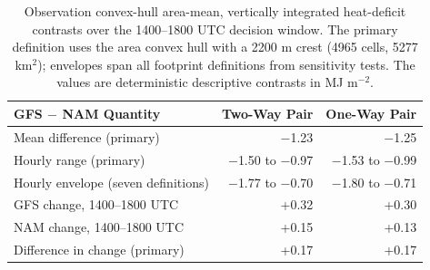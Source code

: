 \documentclass[air,article,accept,moreauthors]{Definitions/mdpi}
\begin{document}
\vspace{-9pt}
\begin{table}[H]
\caption{Observation convex-hull area-mean, vertically integrated heat-deficit contrasts over the 1400--1800 UTC decision window.
The primary definition uses the area convex hull with a 2200 m crest (4965 cells, 5277 km$^{2}$); envelopes span all footprint definitions from sensitivity tests.
The values are deterministic descriptive contrasts in MJ m$^{-2}$.}
\label{tab:v3-heatdeficit}

\centering
\small
\begin{tabularx}{0.85\textwidth}{lRR}
\toprule
\textbf{GFS $\boldsymbol{-}$ NAM Quantity} & \textbf{Two-Way Pair} & \textbf{One-Way Pair} \\
\midrule
Mean difference (primary) & $-$1.23 & $-$1.25 \\
Hourly range (primary) & $-$1.50 to $-$0.97 & $-$1.53 to $-$0.99 \\
Hourly envelope (seven definitions) & $-$1.77 to $-$0.70 & $-$1.80 to $-$0.71 \\

\midrule
GFS change, 1400--1800 UTC & +0.32 & +0.30 \\
NAM change, 1400--1800 UTC & +0.15 & +0.13 \\
Difference in change (primary) & +0.17 & +0.17 \\
\bottomrule
\end{tabularx}
\end{table}
\end{document}
